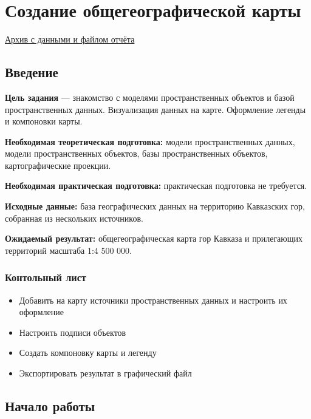 \documentclass[
  12pt,
]{book}
\providecommand{\tightlist}{%
  \setlength{\itemsep}{0pt}\setlength{\parskip}{0pt}}
\begin{document}
\hypertarget{map-design-general}{%
\chapter{Создание общегеографической карты}\label{map-design-general}}

\href{https://1drv.ms/u/s!AmtmZDq3JgxHgZUGIl2IXikh_JmrhA?e=NdRmIe}{Архив с данными и файлом отчёта}

\hypertarget{map-design-general-intro}{%
\section{Введение}\label{map-design-general-intro}}

\textbf{Цель задания} --- знакомство с моделями пространственных объектов и базой пространственных данных. Визуализация данных на карте. Оформление легенды и компоновки карты.

\textbf{Необходимая теоретическая подготовка:} модели пространственных данных, модели пространственных объектов, базы пространственных объектов, картографические проекции.

\textbf{Необходимая практическая подготовка:} практическая подготовка не требуется.

\textbf{Исходные данные:} база географических данных на территорию Кавказских гор, собранная из нескольких источников.

\textbf{Ожидаемый результат:} общегеографическая карта гор Кавказа и прилегающих территорий масштаба 1:4 500 000.

\hypertarget{map-design-general-checklist}{%
\subsection{Контольный лист}\label{map-design-general-checklist}}

\begin{itemize}
\tightlist
\item
  Добавить на карту источники пространственных данных и настроить их оформление
\item
  Настроить подписи объектов
\item
  Создать компоновку карты и легенду
\item
  Экспортировать результат в графический файл
\end{itemize}

\hypertarget{map-design-general-begin}{%
\section{Начало работы}\label{map-design-general-begin}}
\end{document}
